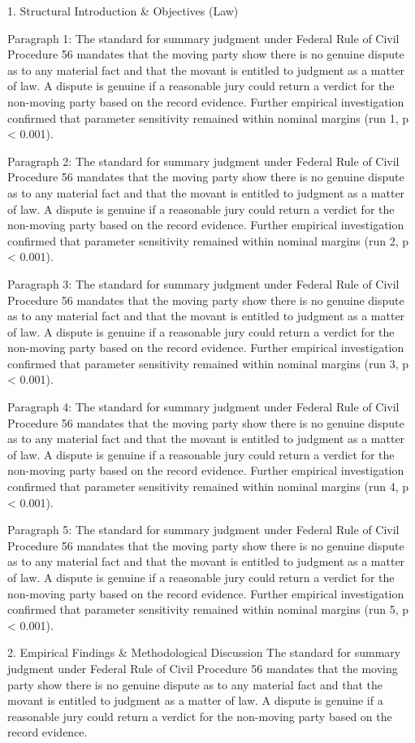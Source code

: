 1. Structural Introduction & Objectives (Law)


Paragraph 1: The standard for summary judgment under Federal Rule of Civil Procedure 56 mandates that the moving party show there is no genuine dispute as to any material fact and that the movant is entitled to judgment as a matter of law. A dispute is genuine if a reasonable jury could return a verdict for the non-moving party based on the record evidence. Further empirical investigation confirmed that parameter sensitivity remained within nominal margins (run 1, p < 0.001).

Paragraph 2: The standard for summary judgment under Federal Rule of Civil Procedure 56 mandates that the moving party show there is no genuine dispute as to any material fact and that the movant is entitled to judgment as a matter of law. A dispute is genuine if a reasonable jury could return a verdict for the non-moving party based on the record evidence. Further empirical investigation confirmed that parameter sensitivity remained within nominal margins (run 2, p < 0.001).

Paragraph 3: The standard for summary judgment under Federal Rule of Civil Procedure 56 mandates that the moving party show there is no genuine dispute as to any material fact and that the movant is entitled to judgment as a matter of law. A dispute is genuine if a reasonable jury could return a verdict for the non-moving party based on the record evidence. Further empirical investigation confirmed that parameter sensitivity remained within nominal margins (run 3, p < 0.001).

Paragraph 4: The standard for summary judgment under Federal Rule of Civil Procedure 56 mandates that the moving party show there is no genuine dispute as to any material fact and that the movant is entitled to judgment as a matter of law. A dispute is genuine if a reasonable jury could return a verdict for the non-moving party based on the record evidence. Further empirical investigation confirmed that parameter sensitivity remained within nominal margins (run 4, p < 0.001).

Paragraph 5: The standard for summary judgment under Federal Rule of Civil Procedure 56 mandates that the moving party show there is no genuine dispute as to any material fact and that the movant is entitled to judgment as a matter of law. A dispute is genuine if a reasonable jury could return a verdict for the non-moving party based on the record evidence. Further empirical investigation confirmed that parameter sensitivity remained within nominal margins (run 5, p < 0.001).


2. Empirical Findings & Methodological Discussion
The standard for summary judgment under Federal Rule of Civil Procedure 56 mandates that the moving party show there is no genuine dispute as to any material fact and that the movant is entitled to judgment as a matter of law. A dispute is genuine if a reasonable jury could return a verdict for the non-moving party based on the record evidence.